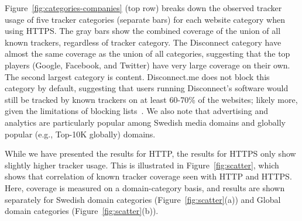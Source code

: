\documentclass[letterpaper]{sig-alternate-10pt}
\begin{document}
Figure~\ref{fig:categories-companies} (top row) breaks down the observed 
tracker usage of five tracker categories (separate bars) for each website category when using HTTPS.
The gray bars show the combined coverage of the union of all known trackers, 
regardless of tracker category.  
The Disconnect category
have almost the same coverage as the union of all categories,
suggesting that
the top players (Google, Facebook, and Twitter) 
have very large coverage on their own.
The second largest category is content.
Disconnect.me does not block this category by default,
suggesting that users running Disconnect's software would 
still be tracked by known trackers on at least 60-70\% of the websites;
likely more, given the limitations of blocking lists~\cite{MPS+13, KrWi06}.
We also note that advertising and analytics are particularly popular
among Swedish media domains and globally popular (e.g., Top-10K globally) domains. 

While we have presented the results for HTTP,
the results for HTTPS 
only show
slightly higher tracker usage.
This is illustrated in Figure~\ref{fig:scatter},
which shows that correlation of known tracker coverage seen with HTTP and HTTPS.
Here, coverage is measured on a domain-category basis,
and results are shown separately for Swedish domain categories (Figure~\ref{fig:scatter}(a))
and Global domain categories (Figure~\ref{fig:scatter}(b)).
\end{document}
